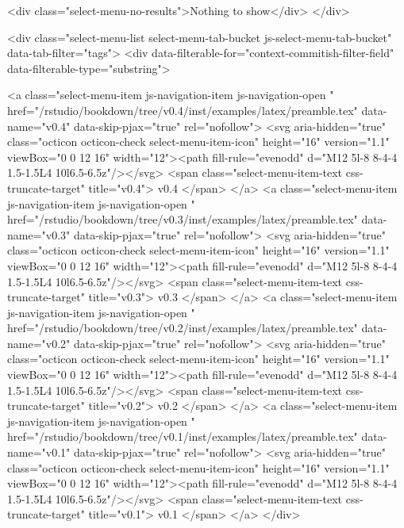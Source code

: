           <div class="select-menu-no-results">Nothing to show</div>
      </div>

      <div class="select-menu-list select-menu-tab-bucket js-select-menu-tab-bucket" data-tab-filter="tags">
        <div data-filterable-for="context-commitish-filter-field" data-filterable-type="substring">


            <a class="select-menu-item js-navigation-item js-navigation-open "
              href="/rstudio/bookdown/tree/v0.4/inst/examples/latex/preamble.tex"
              data-name="v0.4"
              data-skip-pjax="true"
              rel="nofollow">
              <svg aria-hidden="true" class="octicon octicon-check select-menu-item-icon" height="16" version="1.1" viewBox="0 0 12 16" width="12"><path fill-rule="evenodd" d="M12 5l-8 8-4-4 1.5-1.5L4 10l6.5-6.5z"/></svg>
              <span class="select-menu-item-text css-truncate-target" title="v0.4">
                v0.4
              </span>
            </a>
            <a class="select-menu-item js-navigation-item js-navigation-open "
              href="/rstudio/bookdown/tree/v0.3/inst/examples/latex/preamble.tex"
              data-name="v0.3"
              data-skip-pjax="true"
              rel="nofollow">
              <svg aria-hidden="true" class="octicon octicon-check select-menu-item-icon" height="16" version="1.1" viewBox="0 0 12 16" width="12"><path fill-rule="evenodd" d="M12 5l-8 8-4-4 1.5-1.5L4 10l6.5-6.5z"/></svg>
              <span class="select-menu-item-text css-truncate-target" title="v0.3">
                v0.3
              </span>
            </a>
            <a class="select-menu-item js-navigation-item js-navigation-open "
              href="/rstudio/bookdown/tree/v0.2/inst/examples/latex/preamble.tex"
              data-name="v0.2"
              data-skip-pjax="true"
              rel="nofollow">
              <svg aria-hidden="true" class="octicon octicon-check select-menu-item-icon" height="16" version="1.1" viewBox="0 0 12 16" width="12"><path fill-rule="evenodd" d="M12 5l-8 8-4-4 1.5-1.5L4 10l6.5-6.5z"/></svg>
              <span class="select-menu-item-text css-truncate-target" title="v0.2">
                v0.2
              </span>
            </a>
            <a class="select-menu-item js-navigation-item js-navigation-open "
              href="/rstudio/bookdown/tree/v0.1/inst/examples/latex/preamble.tex"
              data-name="v0.1"
              data-skip-pjax="true"
              rel="nofollow">
              <svg aria-hidden="true" class="octicon octicon-check select-menu-item-icon" height="16" version="1.1" viewBox="0 0 12 16" width="12"><path fill-rule="evenodd" d="M12 5l-8 8-4-4 1.5-1.5L4 10l6.5-6.5z"/></svg>
              <span class="select-menu-item-text css-truncate-target" title="v0.1">
                v0.1
              </span>
            </a>
        </div>


